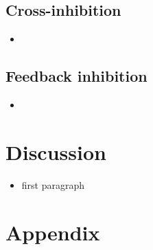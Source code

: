 \documentclass[a4paper,10pt]{scrartcl}
\begin{document}
	\subsection{Cross-inhibition}
	\begin{itemize}
		\item 
	\end{itemize}
	\subsection{Feedback inhibition}
	\begin{itemize}
		\item 
	\end{itemize}
	\section{Discussion}
	\begin{itemize}
		\item first paragraph
	\end{itemize}
	\newpage
	
	
	
	\newpage
	\appendix
	\section{Appendix}

	
\end{document}
